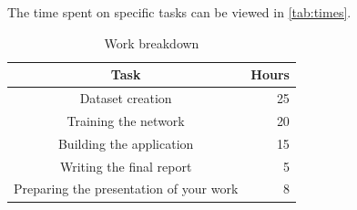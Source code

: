 \documentclass{article}
\begin{document}
The time spent on specific tasks can be viewed in \autoref{tab:times}.
\begin{table}
\begin{tabular}{c r}
Task & Hours \\
\hline
Dataset creation & 25 \\
Training the network & 20 \\
Building the application & 15 \\
Writing the final report & 5 \\
Preparing the presentation of your work & 8 \\
\end{tabular}
\caption{Work breakdown}
\label{tab:times}
\end{table}




\end{document}
